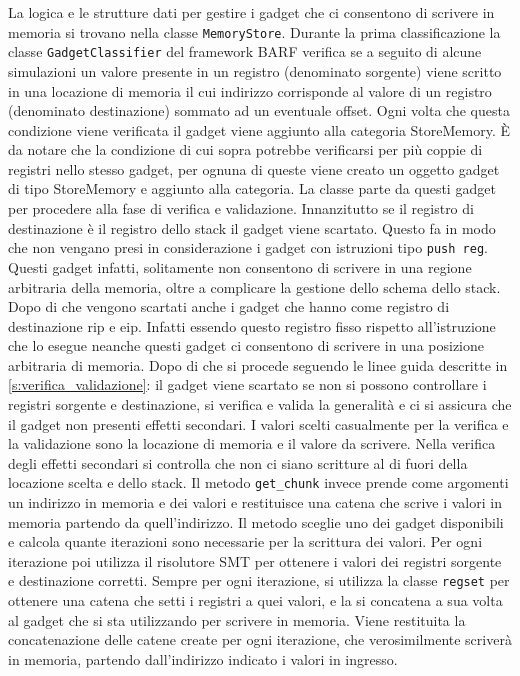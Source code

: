 La logica e le strutture dati per gestire i gadget che ci consentono
di scrivere in memoria si trovano nella classe
\lstinline{MemoryStore}.  Durante la prima classificazione la classe
\lstinline{GadgetClassifier} del framework BARF verifica se a seguito
di alcune simulazioni un valore presente in un registro (denominato
sorgente) viene scritto in una locazione di memoria il cui indirizzo
corrisponde al valore di un registro (denominato destinazione) sommato
ad un eventuale offset. Ogni volta che questa condizione viene
verificata il gadget viene aggiunto alla categoria StoreMemory. È da
notare che la condizione di cui sopra potrebbe verificarsi per più
coppie di registri nello stesso gadget, per ognuna di queste viene
creato un oggetto gadget di tipo StoreMemory e aggiunto alla
categoria. La classe parte da questi gadget per procedere alla fase di
verifica e validazione. Innanzitutto se il registro di destinazione è
il registro dello stack il gadget viene scartato. Questo fa in modo
che non vengano presi in considerazione i gadget con istruzioni tipo
\lstinline{push reg}. Questi gadget infatti, solitamente non
consentono di scrivere in una regione arbitraria della memoria, oltre
a complicare la gestione dello schema dello stack. Dopo di che vengono
scartati anche i gadget che hanno come registro di destinazione rip e
eip. Infatti essendo questo registro fisso rispetto all'istruzione che
lo esegue neanche questi gadget ci consentono di scrivere in una
posizione arbitraria di memoria. Dopo di che si procede seguendo le
linee guida descritte in \ref{s:verifica_validazione}: il gadget
viene scartato se non si possono controllare i registri sorgente e
destinazione, si verifica e valida la generalità e ci si assicura che
il gadget non presenti effetti secondari. I valori scelti casualmente
per la verifica e la validazione sono la locazione di memoria e il
valore da scrivere. Nella verifica degli effetti secondari si
controlla che non ci siano scritture al di fuori della locazione
scelta e dello stack. Il metodo \lstinline{get_chunk} invece prende
come argomenti un indirizzo in memoria e dei valori e restituisce una
catena che scrive i valori in memoria partendo da quell'indirizzo. Il
metodo sceglie uno dei gadget disponibili e calcola quante iterazioni
sono necessarie per la scrittura dei valori. Per ogni iterazione poi
utilizza il risolutore SMT per ottenere i valori dei registri sorgente
e destinazione corretti. Sempre per ogni iterazione, si utilizza la
classe \lstinline{regset} per ottenere una catena che setti i registri
a quei valori, e la si concatena a sua volta al gadget che si sta
utilizzando per scrivere in memoria. Viene restituita la
concatenazione delle catene create per ogni iterazione, che
verosimilmente scriverà in memoria, partendo dall'indirizzo indicato
i valori in ingresso.

